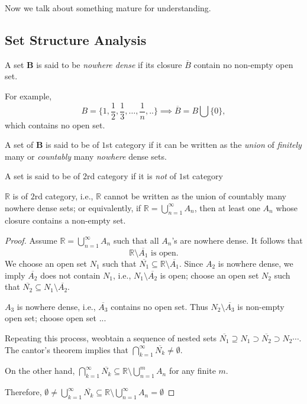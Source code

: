 Now we talk about something mature for understanding.

\subsection{Set Structure Analysis}
\begin{definition}
A set $\bm B$ is said to be \emph{nowhere dense} if its closure $\overline{B}$ contain no non-empty open set.
\end{definition}
For example,
\[
B = \{1,\frac{1}{2},\frac{1}{3},\dots,\frac{1}{n},..\}\implies
\overline{B} = B\bigcup\{0\},
\]
which contains no open set.

\begin{definition}[$1$st category]
A set of $\bm B$ is said to be of $1$st category if it can be written as the \emph{union} of \emph{finitely} many or \emph{countably} many \emph{nowhere} dense sets.
\end{definition}
\begin{definition}[$2$rd category]
A set is said to be of $2$rd category if it is \emph{not} of $1$st category
\end{definition}
\begin{theorem}
$\mathbb{R}$ is of $2$rd category, i.e., $\mathbb{R}$ cannot be written as the union of countably many nowhere dense sets; or equivalently, if $\mathbb{R}=\bigcup_{n=1}^\infty A_n$, then at least one $A_n$ whose closure contains a non-empty set.
\end{theorem}

\begin{proof}
Assume $\mathbb{R} = \bigcup_{n=1}^\infty A_n$ such that all $A_n$'s are nowhere dense. It follows that
\[
\mathbb{R}\setminus \overline{A_1}\mbox{ is open}.
\]
We choose an open set $N_1$ such that $\overline{N_1}\subseteq\mathbb{R}\setminus \overline{A_1}$. Since $A_2$ is nowhere dense, we imply $\overline{A_2}$ does not contain $N_1$, i.e., $N_1\setminus \overline{A_2}$ is open; choose an open set $N_2$ such that $\overline{N_2}\subseteq N_1\setminus\overline{A_2}$.

$A_3$ is nowhere dense, i.e., $\overline{A_3}$ contains no open set. Thus $N_2\setminus\overline{A_3}$ is non-empty open set; choose open set ...

Repeating this process, weobtain a sequence of nested  sets $\overline{N_1}\supseteq N_1\supset\overline{N_2}\supset N_2\cdots$. The cantor's theorem implies that $\bigcap_{k=1}^\infty\overline{N_k}\ne\emptyset$.

On the other hand, $\bigcap_{k=1}^\infty\overline{N_k}\subseteq\mathbb{R}\setminus \bigcup_{n=1}^mA_n$ for any finite $m$.

Therefore, $\emptyset\ne\bigcup_{k=1}^\infty\overline{N_k}\subseteq\mathbb{R}\setminus \bigcup_{n=1}^\infty A_n=\emptyset$
\end{proof}


